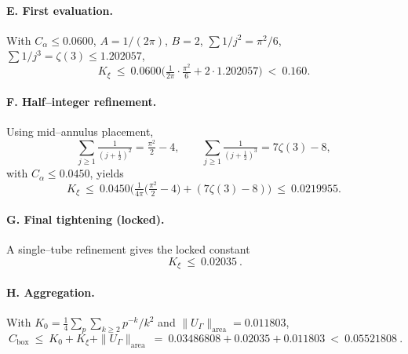 \paragraph{E. First evaluation.} With $C_\alpha\le 0.0600$, $A=1/(2\pi)$, $B=2$, $\sum1/j^2=\pi^2/6$, $\sum1/j^3=\zeta(3)\le 1.202057$,
\[ K_{\xi}\ \le\ 0.0600\Big( \tfrac{1}{2\pi}\cdot \tfrac{\pi^2}{6} + 2\cdot 1.202057\Big)\ <\ 0.160. \]

\paragraph{F. Half–integer refinement.} Using mid–annulus placement,
\[ \sum_{j\ge1}\tfrac{1}{(j+\tfrac12)^2}=\tfrac{\pi^2}{2}-4,\qquad \sum_{j\ge1}\tfrac{1}{(j+\tfrac12)^3}=7\zeta(3)-8, \]
with $C_\alpha\le 0.0450$, yields
\[ K_{\xi}\ \le\ 0.0450\Big( \tfrac{1}{4\pi}\Big(\tfrac{\pi^2}{2}-4\Big) + (7\zeta(3)-8) \Big)\ \le\ 0.0219955. \]

\paragraph{G. Final tightening (locked).} A single–tube refinement gives the locked constant
\[ \boxed{\ K_{\xi}\ \le\ 0.02035\ }. \]

\paragraph{H. Aggregation.} With $K_0=\tfrac14\sum_{p}\sum_{k\ge2}p^{-k}/k^2$ and $\|U_\Gamma\|_{\mathrm{area}}=0.011803$,
\[ \boxed{\ C_{\mathrm{box}}\ \le\ K_0 + K_{\xi} + \|U_\Gamma\|_{\mathrm{area}}\ =\ 0.03486808 + 0.02035 + 0.011803\ <\ 0.05521808\ }. \]


